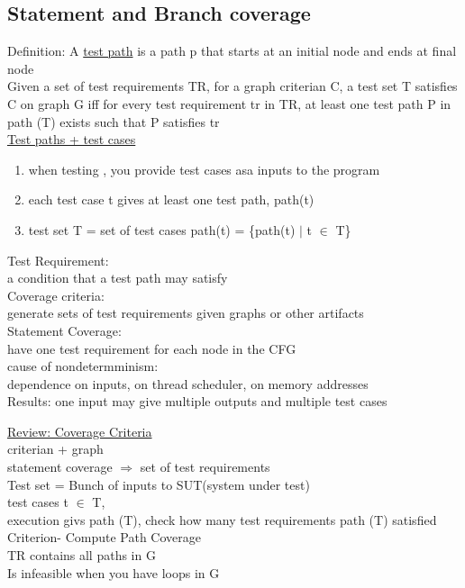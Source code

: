 \documentclass[10pt,usletter]{article}
\newcommand{\tab}[1][1cm]{\hspace*{#1}}
\begin{document}
\subsection{Statement and Branch coverage}
Definition: A \underline{test path} is a path p that starts at an initial node and ends at final node\\
Given a set of test requirements TR, for a graph criterian C, a test set T satisfies C on graph G iff for every test requirement tr in TR, at least one test path P in path (T) exists such that P satisfies tr\\
\underline{Test paths + test cases}
\begin{enumerate}
\item when testing , you provide test cases asa inputs to the program
\item each test case t gives at least one test path, path(t)
\item test set T = set of test cases path(t) = \{path(t) $\vert$ t $\in$ T\}
\end{enumerate}
Test Requirement:\\
\tab a condition that a test path may satisfy\\
Coverage criteria:\\
\tab generate sets of test requirements given graphs or other artifacts\\
Statement Coverage:\\
\tab have one test requirement for each node in the CFG\\
cause of nondetermminism:\\
\tab dependence on inputs, on thread scheduler, on memory addresses\\
Results: one input may give multiple outputs and multiple test cases

\underline{Review: Coverage Criteria}\\
criterian + graph \\
statement coverage $\Rightarrow$ set of test requirements\\

Test set = Bunch of inputs to SUT(system under test)\\
test cases t $\in$ T,\\
execution givs path (T), check how many test requirements path (T) satisfied\\

Criterion- Compute Path Coverage\\
TR contains all paths in G\\
Is infeasible when you have loops in G\\
\end{document}
